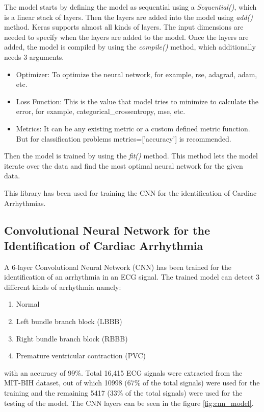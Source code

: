 The model starts by defining the model as sequential using a \textit{Sequential()}, which is a linear stack of layers. Then the layers are added into the model using \textit{add()} method. Keras supports almost all kinds of layers. The input dimensions are needed to specify when the layers are added to the model. Once the layers are added, the model is compiled by using the \textit{compile()} method, which additionally needs 3 arguments.

\begin{itemize}
	\item Optimizer: To optimize the neural network, for example, rse, adagrad, adam, etc.
	\item Loss Function: This is the value that model tries to minimize to calculate the error, for example, categorical\_crossentropy, mse, etc.
	\item Metrics: It can be any existing metric or a custom defined metric function. But for classification problems metrics=['accuracy'] is recommended.
\end{itemize}

Then the model is trained by using the \textit{fit()} method. This method lets the model iterate over the data and find the most optimal neural network for the given data.

This library has been used for training the CNN for the identification of Cardiac Arrhythmias.

\subsection{Convolutional Neural Network for the Identification of Cardiac Arrhythmia}
A 6-layer Convolutional Neural Network (CNN) has been trained for the identification of an arrhythmia in an ECG signal. The trained model can detect 3 different kinds of arrhythmia namely:

\begin{enumerate}
	\item Normal
	\item Left bundle branch block (LBBB)
	\item Right bundle branch block (RBBB)
	\item Premature ventricular contraction (PVC)
\end{enumerate}

with an accuracy of 99\%. Total 16,415 ECG signals were extracted from the MIT-BIH dataset, out of which 10998 (67\% of the total signals) were used for the training and the remaining 5417 (33\% of the total signals) were used for the testing of the model. The CNN layers can be seen in the figure \ref{fig:cnn_model}.



